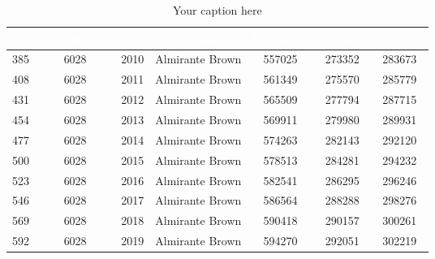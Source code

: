 \begin{table}[htb]
\centering
\begin{tabular}{|c|c|c|c|c|c|c|}
\hline
\textbf{\cellcolor[rgb]{0,0.231,0.427}\textcolor{white}{id}} & \textbf{\cellcolor[rgb]{0,0.231,0.427}\textcolor{white}{CodigoDpto}} & \textbf{\cellcolor[rgb]{0,0.231,0.427}\textcolor{white}{ano}} & \textbf{\cellcolor[rgb]{0,0.231,0.427}\textcolor{white}{Departamento}} & \textbf{\cellcolor[rgb]{0,0.231,0.427}\textcolor{white}{Poblacion}} & \textbf{\cellcolor[rgb]{0,0.231,0.427}\textcolor{white}{Varones}} & \textbf{\cellcolor[rgb]{0,0.231,0.427}\textcolor{white}{Mujeres}} \\ \hline
385 & 6028 & 2010 & Almirante Brown & 557025 & 273352 & 283673 \\
408 & 6028 & 2011 & Almirante Brown & 561349 & 275570 & 285779 \\
431 & 6028 & 2012 & Almirante Brown & 565509 & 277794 & 287715 \\
454 & 6028 & 2013 & Almirante Brown & 569911 & 279980 & 289931 \\
477 & 6028 & 2014 & Almirante Brown & 574263 & 282143 & 292120 \\
500 & 6028 & 2015 & Almirante Brown & 578513 & 284281 & 294232 \\
523 & 6028 & 2016 & Almirante Brown & 582541 & 286295 & 296246 \\
546 & 6028 & 2017 & Almirante Brown & 586564 & 288288 & 298276 \\
569 & 6028 & 2018 & Almirante Brown & 590418 & 290157 & 300261 \\
592 & 6028 & 2019 & Almirante Brown & 594270 & 292051 & 302219 \\
\hline
\end{tabular}
\caption{Your caption here}
\label{tab:my_table}
\end{table}

